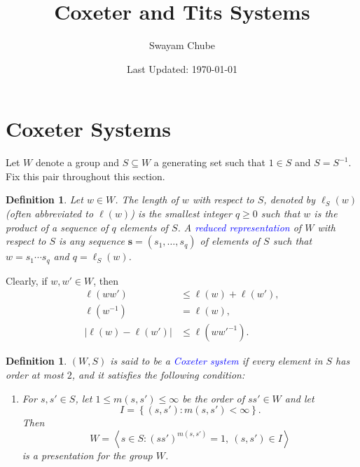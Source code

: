 \documentclass{article}
\title{Coxeter and Tits Systems}
\author{Swayam Chube}
\date{Last Updated: \today}
\theoremstyle{thmstyle}
\theoremstyle{defstyle}
\newtheorem{definition}[theorem]{Definition}
\newcommand{\define}[1]{\textcolor{blue}{\textit{#1}}}
\renewcommand{\le}{\leqslant}
\renewcommand{\ge}{\geqslant}
\begin{document}
\maketitle

\section{Coxeter Systems}

Let $W$ denote a group and $S\subseteq W$ a generating set such that $1\in S$ and $S = S^{-1}$. Fix this pair throughout this section.

\begin{definition}
    Let $w\in W$. The length of $w$ with respect to $S$, denoted by $\ell_S(w)$ (often abbreviated to $\ell(w)$) is the smallest integer $q\ge 0$ such that $w$ is the product of a sequence of $q$ elements of $S$. A \define{reduced representation} of $W$ with respect to $S$ is any sequence $\mathbf s = (s_1,\dots,s_q)$ of elements of $S$ such that $w = s_1\cdots s_q$ and $q = \ell_S(w)$.
\end{definition}

Clearly, if $w, w'\in W$, then 
\begin{align*}
    \ell(ww') &\le\ell(w) + \ell(w'),\\
    \ell(w^{-1}) &= \ell(w),\\
    \left|\ell(w) - \ell(w')\right|&\le\ell(ww'^{-1}).
\end{align*}

\begin{definition}
    $(W, S)$ is said to be a \define{Coxeter system} if every element in $S$ has order at most $2$, and it satisfies the following condition: 
    \begin{enumerate}[label=(Cox)]
        \item For $s, s'\in S$, let $1\le m(s, s')\le\infty$ be the order of $ss'\in W$ and let 
        \begin{equation*}
            I = \left\{(s, s')\colon m(s, s') < \infty\right\}.
        \end{equation*}
        Then 
        \begin{equation*}
            W = \left\langle s\in S\colon (ss')^{m(s, s')} = 1,~(s, s')\in I\right\rangle
        \end{equation*}
        is a presentation for the group $W$.\label{coxeter}
    \end{enumerate}
\end{definition}
\end{document}
